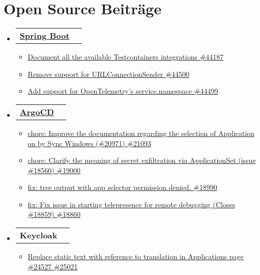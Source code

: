 \documentclass[a4paper,12pt]{article}
\makeatletter
\newcommand{\resumeItem}[1]{
	\item\small{
		{#1 \vspace{-2pt}}
	}
}
\newcommand{\resumeSubheadingSingleLine}[2]{
	\vspace{-2pt}\item
	\begin{tabular*}{0.97\textwidth}[t]{l@{\extracolsep{\fill}}r}
		\textbf{#1} & #2
	\end{tabular*}\vspace{-7pt}
}
\newcommand{\resumeSubHeadingListStart}{\begin{itemize}[leftmargin=0.15in, label={}]}
\newcommand{\resumeSubHeadingListEnd}{\end{itemize}}
\newcommand{\resumeItemListStart}{\begin{itemize}}
\newcommand{\resumeItemListEnd}{\end{itemize}\vspace{-5pt}}
\makeatother
\begin{document}
\section{Open Source Beiträge}
\resumeSubHeadingListStart
	\resumeSubheadingSingleLine{ \href{https://github.com/spring-projects/spring-boot/pulls/thecooldrop}{Spring Boot}}{}{}{}
		\resumeItemListStart[label=]
			\resumeItem{\href{https://github.com/spring-projects/spring-boot/pull/44187}{Document all the available Testcontainers integrations \#44187}}
			\resumeItem{\href{https://github.com/spring-projects/spring-boot/pull/44500}{Remove support for URLConnectionSender \#44500}}
			\resumeItem{\href{https://github.com/spring-projects/spring-boot/pull/44499}{Add support for OpenTelemetry's service.namespace \#44499}}
		\resumeItemListEnd
	\resumeSubheadingSingleLine{ \href{https://github.com/argoproj/argo-cd/pulls/thecooldrop}{ArgoCD}}{}{}{}
		\resumeItemListStart[label=]
			\resumeItem{\href{https://github.com/argoproj/argo-cd/pull/21093}{chore: Improve the documentation regarding the selection of Application on by Sync Windows (\#20971) \#21093}}
			\resumeItem{\href{https://github.com/argoproj/argo-cd/pull/19000}{chore: Clarify the meaning of secret exfiltration via ApplicationSet (issue \#18560) \#19000}}
			\resumeItem{\href{https://github.com/argoproj/argo-cd/pull/18990}{fix: tree output with app selector permission denied. \#18990}}
			\resumeItem{\href{https://github.com/argoproj/argo-cd/pull/18860}{fix: Fix issue in starting telepresence for remote debugging (Closes \#18859) \#18860}}
		\resumeItemListEnd
	\resumeSubheadingSingleLine{ Keycloak}{}{}{}
		\resumeItemListStart[label=]
		\resumeItem{\href{https://github.com/keycloak/keycloak/pull/25021}{Replace static text with reference to translation in Applications page \#24527 \#25021}}
		\resumeItemListEnd
\resumeSubHeadingListEnd
\end{document}
